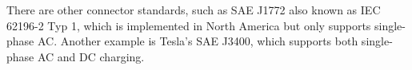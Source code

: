 \documentclass[
	english,
	ruledheaders=section,%
	class=report,%
	thesis={type=Report},%
	accentcolor=9c,%
	custommargins=true,%
	marginpar=false,%
	parskip=half-,%
	fontsize=11pt,%
	logofile={img/tuda_logo.pdf}, %
]{tudapub}
\begin{document}
There are other connector standards, such as SAE J1772 also known as IEC 62196-2 Typ 1, which is implemented in North America but only supports single-phase AC. Another example is Tesla's SAE J3400, which supports both single-phase AC and DC charging.













\end{document}
